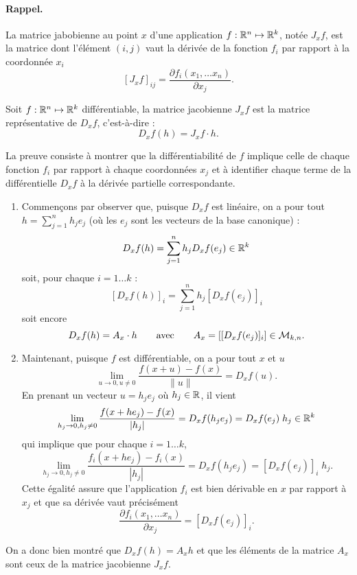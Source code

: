 \paragraph*{Rappel.} La matrice jabobienne au point $x$ d'une application $f : \mathbb{R}^n \mapsto \mathbb{R}^k$, notée $J_xf$, est la matrice dont l'élément $(i, j)$ vaut la dérivée de la fonction $f_i$ par rapport à la coordonnée $x_i$
$$
[J_xf]_{ij} = \frac{\partial f_i(x_1, \dots x_n)}{\partial x_j}.
$$

\begin{proposition*}
  Soit $f : \mathbb{R}^n \mapsto \mathbb{R}^k$ différentiable, la matrice jacobienne $J_xf$ est la matrice représentative de $D_xf$, c'est-à-dire :
  $$
  D_xf(h) = J_xf \cdot h.
  $$
\end{proposition*}

\proof
La preuve consiste à montrer que la différentiabilité de $f$ implique celle de chaque fonction $f_i$ par rapport à chaque coordonnées $x_j$ et à identifier chaque terme de la différentielle $D_xf$ à la dérivée partielle correspondante. 
\begin{enumerate}
  \item Commençons par observer que, puisque $D_x f$ est linéaire, on a pour tout $h = \sum_{j=1}^n h_j e_j$ (où les $e_j$ sont les vecteurs de la base canonique) :
  $$
  D_xf(h) = \sum_{j=1}^n h_j D_xf(e_j) \in \mathbb{R}^k
  $$
  soit, pour chaque $i = 1 \dots k$ :
  $$
  [D_xf(h)]_i = \sum_{j=1}^n h_j [D_xf(e_j)]_i
  $$
  soit encore
  $$
  D_xf(h) = A_x \cdot h
  \qquad \text{avec} \qquad
  A_x = \left[ [D_xf(e_j)]_i \right] \in \mathcal{M}_{k, n}.
  $$
  \item Maintenant, puisque $f$ est différentiable, on a pour tout $x$ et $u$
  $$
  \lim_{u\rightarrow 0, u \neq 0} \frac{f(x+u) - f(x)}{\|u\|} = D_xf(u).
  $$
  En prenant un vecteur $u = h_j e_j$ où $h_j \in \mathbb{R}$, il vient
  $$
  \lim_{h_j\rightarrow 0, h_j \neq 0} \frac{f(x+h e_j) - f(x)}{|h_j|} = D_xf(h_j e_j)  =  D_xf(e_j) \; h_j \in \mathbb{R}^k
  $$
  qui implique que pour chaque $i = 1 \dots k$, 
  $$
  \lim_{h_j\rightarrow 0, h_j \neq 0} \frac{f_i(x+h e_j) - f_i(x)}{|h_j|} = D_xf(h_j e_j)  = [D_xf(e_j)]_i \; h_j.
  $$
  Cette égalité assure que l'application $f_i$ est bien dérivable en $x$ par rapport à $x_j$ et que sa dérivée vaut précisément
  $$
  \frac{\partial f_i(x_1, \dots x_n)}{\partial x_j} = [D_xf(e_j)]_i.
  $$
\end{enumerate}
On a donc bien montré que $D_xf(h) = A_x h$ et que les éléments de la matrice $A_x$ sont ceux de la matrice jacobienne $J_xf$.
\eproof

